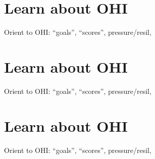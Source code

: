 \documentclass[
]{book}
\begin{document}
\hypertarget{plan}{%
\chapter{Learn about OHI}\label{plan}}

Orient to OHI: ``goals'', ``scores'', pressure/resil,

\hypertarget{conduct}{%
\chapter{Learn about OHI}\label{conduct}}

Orient to OHI: ``goals'', ``scores'', pressure/resil,

\hypertarget{learn}{%
\chapter{Learn about OHI}\label{learn}}

Orient to OHI: ``goals'', ``scores'', pressure/resil,

  
\end{document}
